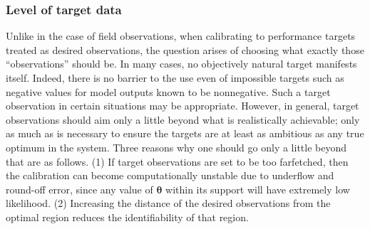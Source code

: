\documentclass{article}
\begin{document}
\subsubsection{Level of target data}\label{level_of_desired_data}
Unlike in the case of field observations, when calibrating to performance targets treated as desired observations, the question arises of choosing what exactly those ``observations'' should be.
%
In many cases, no objectively natural target manifests itself. 
%
Indeed, there is no barrier to the use even of impossible targets such as negative values for model outputs known to be nonnegative.
%
Such a target observation in certain situations may be appropriate. 
%
However, in general, target observations should aim only a little beyond what is realistically achievable; only as much as is necessary to ensure the targets are at least as ambitious as any true optimum in the system.
%
Three reasons why one should go only a little beyond that are as follows. 
%
(1) If target observations are set to be too farfetched, then the calibration can become computationally unstable due  to underflow and round-off error, since any value of $\boldsymbol \theta$ within its support will have extremely low likelihood.
%
%
(2) Increasing the distance of the desired observations from the optimal region reduces the identifiability of that region.
\end{document}
